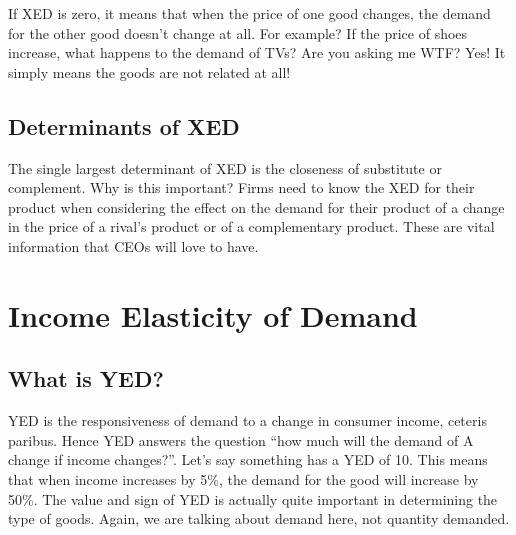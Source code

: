 \documentclass[DIV=calc,11pt,parskip,numbers=noenddot]{scrartcl} %
\begin{document}
If XED is zero, it means that when the price of one good changes, the demand for the other good doesn’t change at all. For example? If the price of shoes increase, what happens to the demand of TVs? Are you asking me WTF? Yes! It simply means the goods are not related at all!
\subsection{Determinants of XED}
The single largest determinant of XED is the closeness of substitute or complement. Why is this important? Firms need to know the XED for their product when considering the effect on the demand for their product of a change in the price of a rival’s product or of a complementary product. These are vital information that CEOs will love to have.
\newpage
\section{Income Elasticity of Demand}
\subsection{What is YED?}
YED is the responsiveness of demand to a change in consumer income, ceteris paribus. Hence YED answers the question “how much will the demand of A change if income changes?”. Let’s say something has a YED of 10. This means that when income increases by 5\%, the demand for the good will increase by 50\%. The value and sign of YED is actually quite important in determining the type of goods. Again, we are talking about demand here, not quantity demanded.
\end{document}
